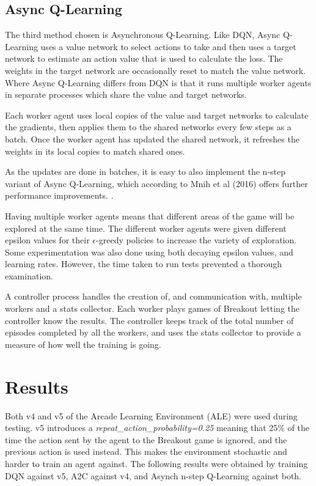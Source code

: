 \documentclass{article}
\begin{document}
\subsection{Async Q-Learning}

The third method chosen is Asynchronous Q-Learning. 
Like DQN, Async Q-Learning uses a value network to select actions to take and then uses a target network to estimate an action value that is used to calculate the loss. The weights in the target network are occasionally reset to match the value network.
Where Async Q-Learning differs from DQN is that it runs multiple worker agents in separate processes which share the value and target networks.

Each worker agent uses local copies of the value and target networks to calculate the gradients, then applies them to the  shared networks every few steps as a batch.
Once the worker agent has updated the shared network, it refreshes the weights in its local copies to match shared ones.

As the updates are done in batches, it is easy to also implement the n-step variant of Async Q-Learning, which according to Mnih et al (2016) offers further performance improvements. .

Having multiple worker agents means that different areas of the game will be explored at the same time.
The different worker agents were given different epsilon values for their $\epsilon$-greedy policies to increase the variety of exploration.
Some experimentation was also done using both decaying epsilon values, and learning rates. However, the time taken to run tests prevented a thorough examination.

A controller process handles the creation of, and communication with, multiple workers and a stats collector.
Each worker plays games of Breakout letting the controller know the results.
The controller keeps track of the total number of episodes completed by all the workers, and uses the stats collector to provide a measure of how well the training is going.

\section{Results}

Both v4 and v5 of the Arcade Learning Environment (ALE) were used during testing. 
v5 introduces a \emph{repeat\_action\_probability=0.25} meaning that 25\% of the time the action sent by the agent to the Breakout game is ignored, and the previous action is used instead. This makes the environment stochastic and harder to train an agent against. The following results were obtained by training DQN against v5, A2C against v4, and Asynch n-step Q-Learning against both.
\end{document}
